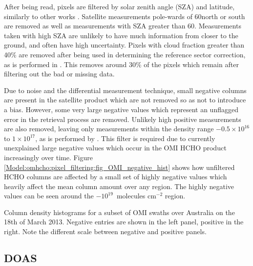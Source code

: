     After being read, pixels are filtered by solar zenith angle (SZA) and latitude, similarly to other works \parencite[e.g.,][]{Marais2012, Barkley2013, Bauwens2016, Zhu2016}.
    Satellite measurements pole-wards of 60\degr north or south are removed as well as measurements with SZA greater than 60\degr.
    Measurements taken with high SZA are unlikely to have much information from closer to the ground, and often have high uncertainty.
    Pixels with cloud fraction greater than 40\% are removed after being used in determining the reference sector correction, as is performed in \textcite{Abad2015, DeSmedt2015}.
    This removes around 30\% of the pixels which remain after filtering out the bad or missing data.

    Due to noise and the differential measurement technique, small negative columns are present in the satellite product which are not removed so as not to introduce a bias.
    However, some very large negative values which represent an unflagged error in the retrieval process are removed.
    Unlikely high positive measurements are also removed, leaving only measurements within the density range $-0.5 \times 10^{16}$ to $1 \times 10^{17} $\moleccm, as is performed by \textcite{Zhu2016}.
    This filter is required due to currently unexplained large negative values which occur in the OMI HCHO product increasingly over time.
    Figure \ref{Model:omhcho:pixel_filtering:fig_OMI_negative_hist} shows how unfiltered HCHO columns are affected by a small set of highly negative values which heavily affect the mean column amount over any region.
    The highly negative values can be seen around the $-10^{19}$~molecules cm$^{-2}$ region.
    
    {
      Column density histograms for a subset of OMI swaths over Australia on the 18th of March 2013.
      Negative entries are shown in the left panel, positive in the right.
      Note the different scale between negative and positive panels.}
    {\label{Model:omhcho:pixel_filtering:fig_OMI_negative_hist}}
  
  \subsection{DOAS}
    \label{Model:omhcho:DOAS}
    
